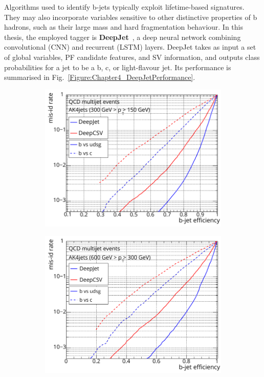 Algorithms used to identify b-jets typically exploit lifetime-based signatures. They may also incorporate variables sensitive to other distinctive properties of b hadrons, such as their large mass and hard fragmentation behaviour. In this thesis, the employed tagger is \textbf{DeepJet}~\cite{DeepJet}, a deep neural network combining convolutional (CNN) and recurrent (LSTM) layers. DeepJet takes as input a set of global variables, PF candidate features, and SV information, and outputs class probabilities for a jet to be a b, c, or light-flavour jet. Its performance is summarised in Fig.~\ref{Figure:Chapter4_DeepJetPerformance}.

\begin{figure}[h]
    \centering
    \begin{subfigure}[b]{0.49\textwidth}
        \centering
        \includegraphics[width=\textwidth]{Figures/Chapter4/deepJet_lowpt.pdf}
        \caption{}
    \end{subfigure}
    \begin{subfigure}[b]{0.49\textwidth}
        \centering
        \includegraphics[width=\textwidth]{Figures/Chapter4/deepjet_mediumpt.pdf}

\end{subfigure}
\end{figure}
